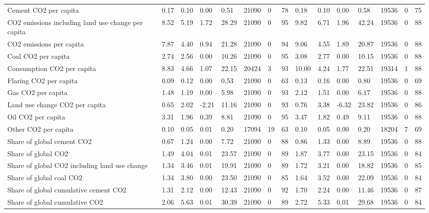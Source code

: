 \begin{longtable}{lllllllllllllll}
\addlinespace
Cement CO2 per capita & 0.17 & 0.10 & 0.00 & 0.51 & 21090 & 0 & 78 & 0.18 & 0.10 & 0.00 & 0.58 & 19536 & 0 & 75\\
CO2 emissions including land use change per capita & 8.52 & 5.19 & 1.72 & 28.29 & 21090 & 0 & 95 & 9.82 & 6.71 & 1.96 & 42.24 & 19536 & 0 & 88\\
CO2 emissions per capita & 7.87 & 4.40 & 0.94 & 21.28 & 21090 & 0 & 94 & 9.06 & 4.55 & 1.89 & 20.87 & 19536 & 0 & 88\\
Coal CO2 per capita & 2.74 & 2.56 & 0.00 & 10.26 & 21090 & 0 & 95 & 3.08 & 2.77 & 0.00 & 10.15 & 19536 & 0 & 88\\
Consumption CO2 per capita & 8.83 & 4.66 & 1.07 & 22.15 & 20424 & 3 & 93 & 10.00 & 4.24 & 1.77 & 22.51 & 19314 & 1 & 88\\
\addlinespace
Flaring CO2 per capita & 0.09 & 0.12 & 0.00 & 0.53 & 21090 & 0 & 63 & 0.13 & 0.16 & 0.00 & 0.80 & 19536 & 0 & 69\\
Gas CO2 per capita & 1.48 & 1.19 & 0.00 & 5.98 & 21090 & 0 & 93 & 2.12 & 1.51 & 0.00 & 6.17 & 19536 & 0 & 88\\
Land use change CO2 per capita & 0.65 & 2.02 & -2.21 & 11.16 & 21090 & 0 & 93 & 0.76 & 3.38 & -6.32 & 23.82 & 19536 & 0 & 86\\
Oil CO2 per capita & 3.31 & 1.96 & 0.39 & 8.81 & 21090 & 0 & 95 & 3.47 & 1.82 & 0.49 & 9.11 & 19536 & 0 & 88\\
Other CO2 per capita & 0.10 & 0.05 & 0.01 & 0.20 & 17094 & 19 & 63 & 0.10 & 0.05 & 0.00 & 0.20 & 18204 & 7 & 69\\
\addlinespace
Share of global cement CO2 & 0.67 & 1.24 & 0.00 & 7.72 & 21090 & 0 & 88 & 0.86 & 1.33 & 0.00 & 8.89 & 19536 & 0 & 88\\
Share of global CO2 & 1.49 & 4.04 & 0.01 & 23.57 & 21090 & 0 & 89 & 1.87 & 3.77 & 0.00 & 23.15 & 19536 & 0 & 84\\
Share of global CO2 including land use change & 1.34 & 3.46 & 0.01 & 19.91 & 21090 & 0 & 89 & 1.72 & 3.21 & 0.00 & 18.82 & 19536 & 0 & 85\\
Share of global coal CO2 & 1.34 & 3.80 & 0.00 & 23.50 & 21090 & 0 & 85 & 1.64 & 3.52 & 0.00 & 22.09 & 19536 & 0 & 84\\
Share of global cumulative cement CO2 & 1.31 & 2.12 & 0.00 & 12.43 & 21090 & 0 & 92 & 1.70 & 2.24 & 0.00 & 11.46 & 19536 & 0 & 87\\
\addlinespace
Share of global cumulative CO2 & 2.06 & 5.63 & 0.01 & 30.39 & 21090 & 0 & 89 & 2.72 & 5.33 & 0.01 & 29.68 & 19536 & 0 & 84\\

\end{longtable}
